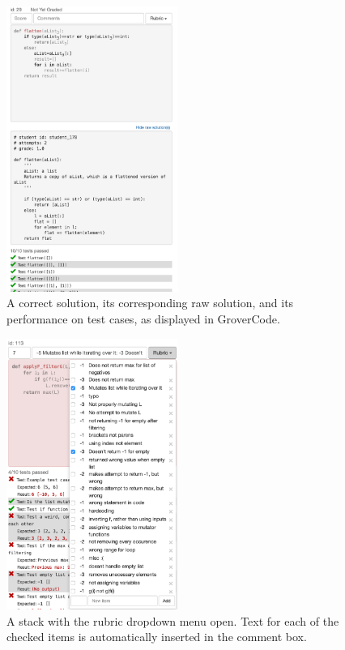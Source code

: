 \begin{figure}
\centering
\includegraphics[width=0.5\textwidth]{Body/figures/grovercode/figure_2}
\caption{A correct solution, its corresponding raw solution, and its performance on test cases, as displayed in GroverCode.}
\label{fig:correct_stack}
\end{figure}
 
\begin{figure}
\centering
\includegraphics[width=0.5\textwidth]{Body/figures/grovercode/figure_3}
\caption{A stack with the rubric dropdown menu open. Text for each of the checked items is automatically inserted in the comment box.}
\label{fig:rubric}
\end{figure}


